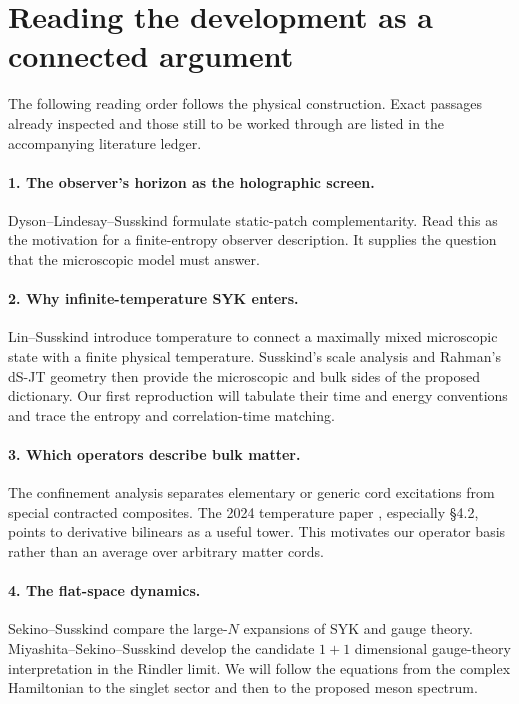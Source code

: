 \documentclass[11pt,a4paper]{article}
\begin{document}
\newpage
\section{Reading the development as a connected argument}
The following reading order follows the physical construction. Exact
passages already inspected and those still to be worked through are
listed in the accompanying literature ledger.

\paragraph{1. The observer's horizon as the holographic screen.}
Dyson--Lindesay--Susskind \cite{dls} formulate static-patch
complementarity. Read this as the motivation for a finite-entropy
observer description. It supplies the question that the microscopic
model must answer.

\paragraph{2. Why infinite-temperature SYK enters.}
Lin--Susskind \cite{ls} introduce tomperature to connect a maximally
mixed microscopic state with a finite physical temperature. Susskind's
scale analysis \cite{scales} and Rahman's dS-JT geometry \cite{rahman}
then provide the microscopic and bulk sides of the proposed dictionary.
Our first reproduction will tabulate their time and energy conventions
and trace the entropy and correlation-time matching.

\paragraph{3. Which operators describe bulk matter.}
The confinement analysis \cite{confine} separates elementary or generic
cord excitations from special contracted composites. The 2024 temperature
paper \cite{temperatures}, especially \S4.2, points to derivative
bilinears as a useful tower. This motivates our operator basis rather
than an average over arbitrary matter cords.

\paragraph{4. The flat-space dynamics.}
Sekino--Susskind \cite{qcd} compare the large-$N$ expansions of SYK and
gauge theory. Miyashita--Sekino--Susskind \cite{mss25} develop the
candidate $1+1$ dimensional gauge-theory interpretation in the Rindler
limit. We will follow the equations from the complex Hamiltonian to
the singlet sector and then to the proposed meson spectrum.
\end{document}
